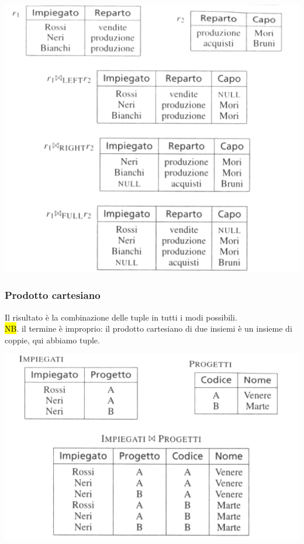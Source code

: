 \documentclass[a4paper]{article}
\begin{document}
\begin{center}
      \includegraphics[scale=0.45]{img/ar8.png}
\end{center}

\subsubsection{Prodotto cartesiano}
Il risultato è la combinazione delle tuple in tutti i modi possibili.\\
\hl{NB}. il termine è improprio: il prodotto cartesiano di due insiemi è un insieme di coppie, qui abbiamo tuple.
\begin{center}
      \includegraphics[scale=0.45]{img/ar9.png}
\end{center}
\end{document}
